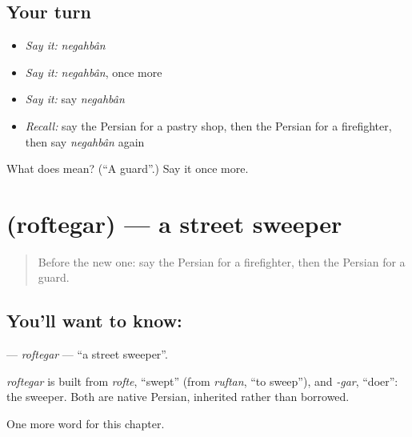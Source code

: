 \subsection*{Your turn}
\begin{itemize}
\raggedright
  \item \emph{Say it:} \emph{negahbân}
  \item \emph{Say it:} \emph{negahbân}, once more
  \item \emph{Say it:} say \emph{negahbân}
  \item \emph{Recall:} say the Persian for a pastry shop, then the Persian for a firefighter, then say \emph{negahbân} again
\end{itemize}

\begin{tcolorbox}[breakable,colback=teal!4,colframe=teal!35!black,title={Before you move on}]
What does  mean? (\textquotedblleft{}A guard\textquotedblright{}.) Say it once more.
\end{tcolorbox}
\section[\texorpdfstring{\fa{رفتگر} (roftegar)}{رفتگر (roftegar)}]{ (roftegar) — a street sweeper}

\label{lesson:FA-C252-roftegar}



\begin{quote}
Before the new one: say the Persian for a firefighter, then the Persian for a guard.
\end{quote}

\subsection*{You'll want to know: }
\textbf{} — \emph{roftegar} — \textquotedblleft{}a street sweeper\textquotedblright{}.

\begin{cousinweb}
\emph{roftegar} is built from \emph{rofte}, \textquotedblleft{}swept\textquotedblright{} (from \emph{ruftan}, \textquotedblleft{}to sweep\textquotedblright{}), and \emph{-gar}, \textquotedblleft{}doer\textquotedblright{}: the sweeper. Both are native Persian, inherited rather than borrowed.
\end{cousinweb}

\begin{grammarlens}[title={What you've built}]
One more word for this chapter.
\end{grammarlens}

